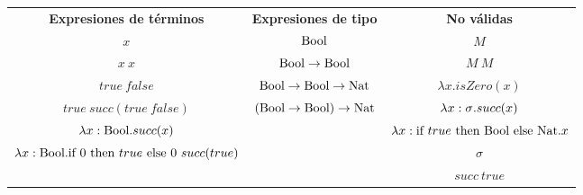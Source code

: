 \documentclass[10pt,a4paper, landscape]{article}
\begin{document}
\vspace*{5mm}
\begin{center}
    \begin{tabular}{c|c|c}
        \textbf{Expresiones de términos} & \textbf{Expresiones de tipo} & \textbf{No válidas}\\
       $x$ & $\text{Bool}$ & $M$ \\ 
       $x~x$ & $\text{Bool}\to \text{Bool}$ & $M~M$ \\      
       $true~false$ & $\text{Bool}\to \text{Bool}\to \text{Nat}$ & $\lambda x.isZero(x)$ \\
       $true~succ(true~false)$ & $(\text{Bool}\to \text{Bool})\to \text{Nat}$ & ${\lambda x: \sigma \text{.} succ(x)}$\\
       $\lambda x: \text{Bool} \text{.} succ(x)$ & & $\lambda x:\text{if } true \text{ then } \text{Bool} \text{ else } \text{Nat}.x$ \\
       $\lambda x: \text{Bool} \text{.} \text{if } 0 \text{ then } true \text{ else } 0~succ(true)$ & & $\sigma$ \\
       & & $succ~true$
%
    \end{tabular}
\end{center}
\vspace*{\fill}
\end{document}
